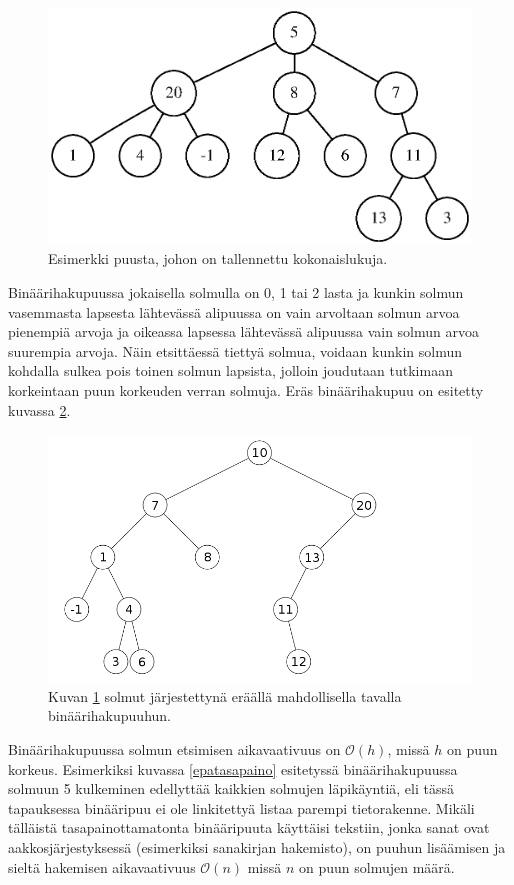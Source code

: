 \documentclass[12pt,a4paper,titlepage]{article}
\begin{document}
\begin{figure}[h]
\centering
\includegraphics[width=13cm]{graphs/puu.eps}
\caption{Esimerkki puusta, johon on tallennettu kokonaislukuja.}
\label{yleinenpuu}
\end{figure}

Binäärihakupuussa jokaisella solmulla on 0, 1 tai 2 lasta ja kunkin solmun vasemmasta lapsesta lähtevässä alipuussa on vain arvoltaan solmun arvoa pienempiä arvoja ja oikeassa lapsessa lähtevässä alipuussa vain solmun arvoa suurempia arvoja. Näin etsittäessä tiettyä solmua, voidaan kunkin solmun kohdalla sulkea pois toinen solmun lapsista, jolloin joudutaan tutkimaan korkeintaan puun korkeuden verran solmuja. Eräs binäärihakupuu on esitetty kuvassa \ref{binaaripuu}. \cite{cormen}

\begin{figure}[H]
\centering
\includegraphics[width=15cm]{kuvat/binaaripuu.png}
\caption{Kuvan \ref{yleinenpuu} solmut järjestettynä eräällä mahdollisella tavalla binäärihakupuuhun.}
\label{binaaripuu}
\end{figure}

Binäärihakupuussa solmun etsimisen aikavaativuus on $\mathcal{O}(h)$, missä $h$ on puun korkeus. Esimerkiksi kuvassa \ref{epatasapaino} esitetyssä binäärihakupuussa solmuun 5 kulkeminen edellyttää kaikkien solmujen läpikäyntiä, eli tässä tapauksessa binääripuu ei ole linkitettyä listaa parempi tietorakenne. Mikäli tälläistä tasapainottamatonta binääripuuta käyttäisi tekstiin, jonka sanat ovat aakkosjärjestyksessä (esimerkiksi sanakirjan hakemisto), on puuhun lisäämisen ja sieltä hakemisen aikavaativuus $\mathcal{O}(n)$ missä $n$ on puun solmujen määrä. \cite{cormen}
\end{document}
